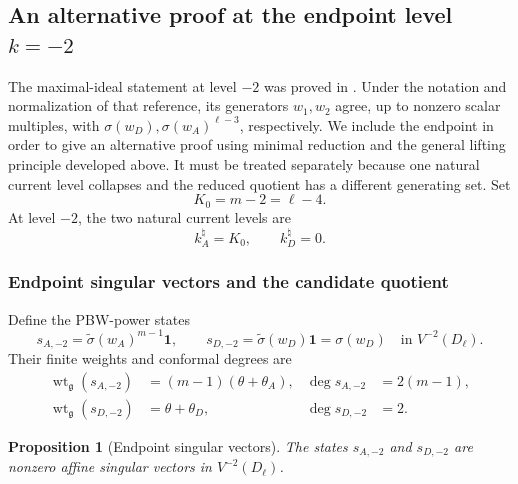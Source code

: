 \documentclass[11pt,reqno]{amsart}
\newtheorem{proposition}[theorem]{Proposition}
\theoremstyle{definition}
\theoremstyle{remark}
\begin{document}
\subsection{An alternative proof at the endpoint level
	\texorpdfstring{$k=-2$}{k=-2}}
\label{dl:sec:Dl-level-minus-two}

The maximal-ideal statement at level $-2$ was proved in
\cite[Section~6, Corollary~6.6(1)]
{AdamovicKacMosenederFrajriaPapiPerse2020}.
Under the notation and normalization of that reference, its generators
$w_1,w_2$ agree, up to nonzero scalar multiples, with
$\sigma(w_D),\sigma(w_A)^{\ell-3}$, respectively.  We include the endpoint
in order to give an alternative proof using minimal reduction and the
general lifting principle developed above.  It must be treated separately
because one natural current level collapses and the reduced quotient has a
different generating set.  Set
\begin{equation*}
	K_0=m-2=\ell-4.
\end{equation*}
At level $-2$, the two natural current levels are
\begin{equation*}
	k_A^\natural=K_0,
	\qquad
	k_D^\natural=0.
\end{equation*}
\subsubsection{Endpoint singular vectors and the candidate quotient}


Define the PBW-power states
\begin{equation*}
  s_{A,-2}
  =
  \widetilde\sigma(w_A)^{m-1}\mathbf1,
  \qquad
  s_{D,-2}
  =
  \widetilde\sigma(w_D)\mathbf1
  =
  \sigma(w_D)
  \quad\text{in }V^{-2}(D_\ell).
\end{equation*}
Their finite weights and conformal degrees are
\begin{equation*}
\begin{aligned}
  \operatorname{wt}_{\mathfrak g}(s_{A,-2})
  &=(m-1)(\theta+\theta_A),
  &\deg s_{A,-2}&=2(m-1),\\
  \operatorname{wt}_{\mathfrak g}(s_{D,-2})
  &=\theta+\theta_D,
  &\deg s_{D,-2}&=2.
\end{aligned}
\end{equation*}

\begin{proposition}[Endpoint singular vectors]

The states \(s_{A,-2}\) and \(s_{D,-2}\) are nonzero affine
singular vectors in \(V^{-2}(D_\ell)\).
\end{proposition}
\end{document}
